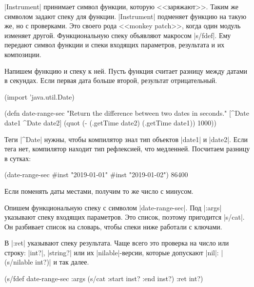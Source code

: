 \spverb|Instrument| принимает символ функции, которую <<заряжают>>. Таким же
символом задают спеку для функции. \spverb|Instrument| подменяет функцию на
такую же, но с проверками. Это своего рода <<monkey patch>>, когда один модуль
изменяет другой. Функциональную спеку объявляют макросом \spverb|s/fdef|. Ему
передают символ функции и спеки входящих параметров, результата и их композиции.


Напишем функцию и спеку к ней. Пусть функция считает разницу между датами в
секундах. Если первая дата больше второй, результат отрицательный.

\begin{english}
  \begin{clojure}
(import 'java.util.Date)

(defn date-range-sec
  "Return the difference between two dates in seconds."
  [^Date date1 ^Date date2]
  (quot (- (.getTime date2)
           (.getTime date1))
        1000))
  \end{clojure}
\end{english}

Теги \spverb|^Date| нужны, чтобы компилятор знал тип объектов \spverb|date1| и
\spverb|date2|. Если тега нет, компилятор находит тип рефлексией, что
медленней. Посчитаем разницу в сутках:

\begin{english}
  \begin{clojure}
(date-range-sec #inst "2019-01-01" #inst "2019-01-02")
86400
  \end{clojure}
\end{english}

\noindent
Если поменять даты местами, получим то же число с минусом.

Опишем функциональную спеку с символом \spverb|date-range-sec|. Под
\spverb|:args| указывают спеку входящих параметров. Это список, поэтому
пригодится \spverb|s/cat|. Он разбивает список на словарь, чтобы спеки ниже
работали с ключами.

В \spverb|:ret| указывают спеку результата. Чаще всего это проверка на число или
строку: \spverb|int?|, \spverb|string?| или их \spverb|nilable|-версии, которые
допускают \spverb|nil|: \spverb|(s/nilable int?)| и так далее.


\begin{english}
  \begin{clojure}
(s/fdef date-range-sec
  :args (s/cat :start inst? :end inst?)
  :ret int?)
  \end{clojure}
\end{english}

